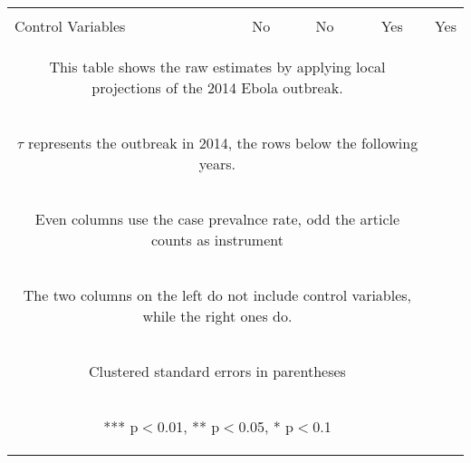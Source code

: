 \documentclass{article}
\begin{document}
\begin{table}[htbp]
{\begin{tabular}{lcccc}
\vspace{4pt} & \begin{footnotesize}\end{footnotesize} & \begin{footnotesize}\end{footnotesize} & \begin{footnotesize}\end{footnotesize} & \begin{footnotesize}\end{footnotesize}\\
Control Variables & No & No & Yes & Yes \\ \hline
\multicolumn{4}{c}{\begin{footnotesize} This table shows the raw estimates by applying local projections of the 2014 Ebola outbreak. \end{footnotesize}} \\
\multicolumn{4}{c}{\begin{footnotesize} $\tau$ represents the outbreak in 2014, the rows below the following years. \end{footnotesize}} \\
\multicolumn{4}{c}{\begin{footnotesize} Even columns use the case prevalnce rate, odd the article counts as instrument \end{footnotesize}} \\
\multicolumn{4}{c}{\begin{footnotesize} The two columns on the left do not include control variables, while the right ones do. \end{footnotesize}} \\
\multicolumn{4}{c}{\begin{footnotesize} Clustered standard errors in parentheses\end{footnotesize}} \\
\multicolumn{4}{c}{\begin{footnotesize} *** p$<$0.01, ** p$<$0.05, * p$<$0.1\end{footnotesize}} \\
\end{tabular}
}
\end{table}

\pagebreak
\end{document}
